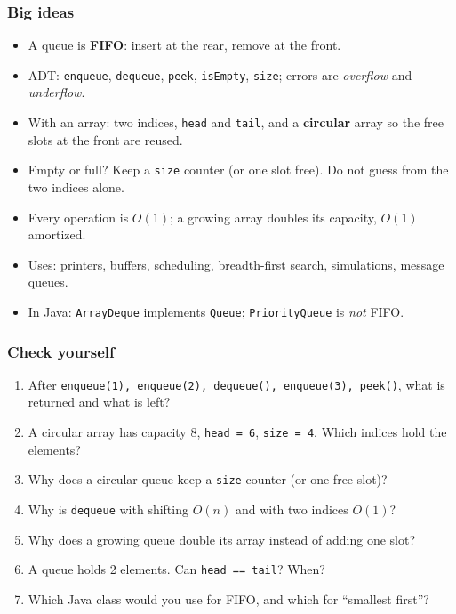 \documentclass[aspectratio=169,10pt,compress]{beamer}
\begin{document}




\begin{frame}[t,fragile] \frametitle{Big ideas}
  \begin{itemize}
    \item A queue is \textbf{FIFO}: insert at the rear, remove at the front.
    \item ADT: \texttt{enqueue}, \texttt{dequeue}, \texttt{peek}, \texttt{isEmpty}, \texttt{size}; errors are \emph{overflow} and \emph{underflow}.
    \item With an array: two indices, \texttt{head} and \texttt{tail}, and a \textbf{circular} array so the free slots at the front are reused.
    \item Empty or full? Keep a \texttt{size} counter (or one slot free). Do not guess from the two indices alone.
    \item Every operation is $O(1)$; a growing array doubles its capacity, $O(1)$ amortized.
    \item Uses: printers, buffers, scheduling, breadth-first search, simulations, message queues.
    \item In Java: \texttt{ArrayDeque} implements \texttt{Queue}; \texttt{PriorityQueue} is \emph{not} FIFO.
  \end{itemize}
\end{frame}




\begin{frame}[t,fragile] \frametitle{Check yourself}
  \begin{enumerate}\small
    \item After \texttt{enqueue(1), enqueue(2), dequeue(), enqueue(3), peek()}, what is returned and what is left?
    \item A circular array has capacity 8, \texttt{head = 6}, \texttt{size = 4}. Which indices hold the elements?
    \item Why does a circular queue keep a \texttt{size} counter (or one free slot)?
    \item Why is \texttt{dequeue} with shifting $O(n)$ and with two indices $O(1)$?
    \item Why does a growing queue double its array instead of adding one slot?
    \item A queue holds 2 elements. Can \texttt{head == tail}? When?
    \item Which Java class would you use for FIFO, and which for ``smallest first''?
  \end{enumerate}
\end{frame}




\begin{frame}[t,fragile]
	\begin{center}
		\vspace{4cm}
	\end{center}
\end{frame}
\end{document}
